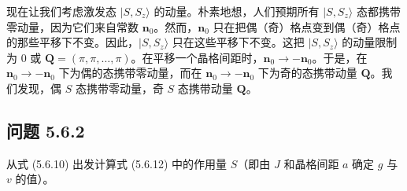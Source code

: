 现在让我们考虑激发态 $|S,S_{z}\rangle$ 的动量。朴素地想，人们预期所有 $|S,S_{z}\rangle$ 态都携带零动量，因为它们来自常数 $\pmb{n}_{0}$。然而，$\pmb{n}_{0}$ 只在把偶（奇）格点变到偶（奇）格点的那些平移下不变。因此，$|S,S_{z}\rangle$ 只在这些平移下不变。这把 $|S,S_{z}\rangle$ 的动量限制为 0 或 $\pmb{Q}=(\pi,\pi,\ldots,\pi)$。在平移一个晶格间距时，$\pmb{n}_{0}\to -\pmb{n}_{0}$。于是，在 $\pmb{n}_{0}\to -\pmb{n}_{0}$ 下为偶的态携带零动量，而在 $\pmb{n}_{0}\to -\pmb{n}_{0}$ 下为奇的态携带动量 $\pmb{Q}$。我们发现，偶 $S$ 态携带零动量，奇 $S$ 态携带动量 $\pmb{Q}$。

\subsection*{问题 5.6.2}

从式 (5.6.10) 出发计算式 (5.6.12) 中的作用量 $S$（即由 $J$ 和晶格间距 $a$ 确定 $g$ 与 $v$ 的值）。

